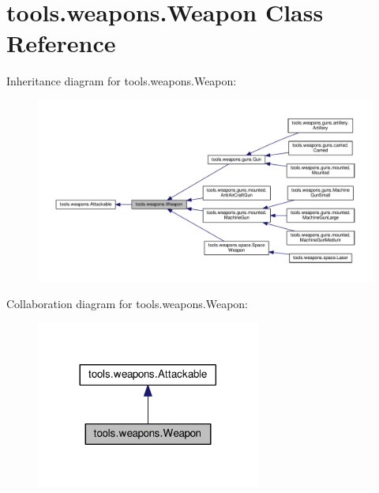 \hypertarget{classtools_1_1weapons_1_1_weapon}{}\section{tools.\+weapons.\+Weapon Class Reference}
\label{classtools_1_1weapons_1_1_weapon}


Inheritance diagram for tools.\+weapons.\+Weapon\+:\nopagebreak
\begin{figure}[H]
\begin{center}
\leavevmode
\includegraphics[width=350pt]{classtools_1_1weapons_1_1_weapon__inherit__graph}
\end{center}
\end{figure}


Collaboration diagram for tools.\+weapons.\+Weapon\+:\nopagebreak
\begin{figure}[H]
\begin{center}
\leavevmode
\includegraphics[width=209pt]{classtools_1_1weapons_1_1_weapon__coll__graph}
\end{center}
\end{figure}

